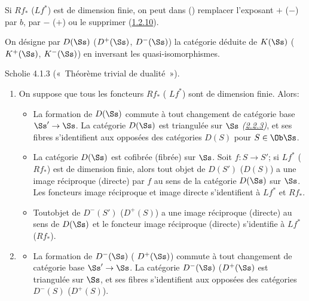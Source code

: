 \documentclass[10pt]{../fichiers-configuration-latex/smfart}
\begin{document}
Si $Rf_{\ast}$ (\resp $Lf^{\ast}$) est de dimension finie, on peut
dans  (\resp {}) remplacer l'exposant $+$ (\resp $-$) par
$b$, par $-$ (\resp $+$) ou le supprimer (\hyperref[XVII.prop1.2.10]{1.2.10}).

On désigne par $D(\Ss)$ (\resp $D^{+}(\Ss)$, \resp
$D^{-}(\Ss)$) la catégorie déduite de $K(\Ss)$ (\resp
$K^{+}(\Ss)$, \resp $K^{-}(\Ss)$) en inversant les
quasi-isomorphismes.

\begin{enonce*}{Scholie 4.1.3}
(« Théorème trivial de dualité »).
\begin{enumerate}
\renewcommand{\theenumi}{\alph{enumi}}
\renewcommand{\labelenumi}{(\theenumi)}
\item On suppose que tous les foncteurs $Rf_{\ast}$ (\resp
$Lf^{\ast}$) sont de dimension finie. Alors:
\begin{itemize}
\item[(i)] La formation de $D(\Ss)$ commute à tout changement
de catégorie base $\Ss'\rightarrow \Ss$. La catégorie
$D(\Ss)$ est triangulée sur $\Ss$ \emph{(\hyperref[XVII.def2.2.3]{2.2.3})}, et ses
fibres s'identifient aux opposées des catégories $D(S)$ pour $S\in \Ob
\Ss$.

\item[(ii)] La catégorie $D(\Ss)$ est cofibrée (\resp fibrée)
sur $\Ss$. Soit $f:S\rightarrow S'$; si $Lf^{\ast}$ (\resp
$Rf_{\ast}$) est de dimension finie, alors tout objet de $D(S')$
(\resp $D(S)$) a une image réciproque (\resp directe) par $f$ au sens
de la catégorie $D(\Ss)$ sur $\Ss$. Les foncteurs
image réciproque et image directe s'identifient à $Lf^{\ast}$ et
$Rf_{\ast}$.

\item[(iii)] Tout\pageoriginale objet de $D^{-}(S')$ (\resp $D^{+}(S)$) a une
image réciproque (\resp directe) au sens de $D(\Ss)$ et le
foncteur image réciproque (\resp directe) s'identifie à $Lf^{\ast}$
(\resp $Rf_{\ast}$).
\end{itemize}

\item \begin{itemize}
\item[(i)] La formation de $D^{-}(\Ss)$ (\resp
$D^{+}(\Ss)$) commute à tout changement de catégorie base
$\Ss'\rightarrow \Ss$. La catégorie
$D^{-}(\Ss)$ (\resp $D^{+}(\Ss)$ est triangulée sur
$\Ss$, et ses fibres s'identifient aux opposées des catégories
$D^{-}(S)$ (\resp $D^{+}(S)$).


\end{itemize}
\end{enumerate}
\end{enonce*}
\end{document}
